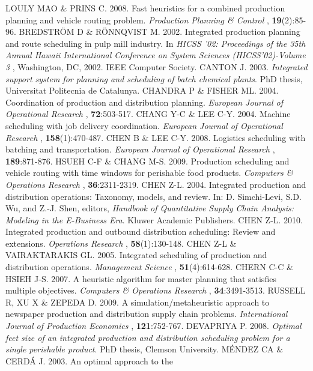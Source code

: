 \begin{biblio}[REFERENCES]
 LOULY MAO \& PRINS C. 2008. Fast heuristics for a
 combined production planning and vehicle routing problem. \textit{Production Planning
 \& Control} , \textbf{19}(2):85-96.
\tit{ }BREDSTRÖM D \& RÖNNQVIST M. 2002. Integrated production planning
 and route scheduling in pulp mill industry. In \textit{HICSS '02: Proceedings of the
 35th Annual Hawaii International Conference on System Sciences (HICSS'02)-Volume
 3} , Washington, DC, 2002. IEEE Computer Society.
\tit{ }CANTON J. 2003. \textit{Integrated support system for planning and
 scheduling of batch chemical plants}. PhD thesis, Universitat Politecnia
 de Catalunya.
\tit{ }CHANDRA P \& FISHER ML. 2004. Coordination of production and
 distribution planning. \textit{European Journal of Operational Research} ,
 \textbf{72}:503-517.
\tit{ }CHANG Y-C \& LEE C-Y. 2004. Machine scheduling with job delivery
 coordination. \textit{European Journal of Operational Research} ,
 \textbf{158}(1):470-487.
\tit{ }CHEN B \& LEE C-Y. 2008. Logistics scheduling with batching and
 transportation. \textit{European Journal of Operational Research} ,
 \textbf{189}:871-876.
 HSUEH C-F \& CHANG M-S. 2009. Production scheduling
 and vehicle routing with time windows for perishable food products. \textit{Computers
 \& Operations Research} , \textbf{36}:2311-2319.
\tit{ }CHEN Z-L. 2004. Integrated production and distribution operations:
 Taxonomy, models, and review. In: D. Simchi-Levi, S.D. Wu, and Z.-J. Shen, editors,
 \textit{Handbook of Quantitative Supply Chain Analysis: Modeling in the E-Business
 Era}. Kluwer Academic Publishers.
\tit{ }CHEN Z-L. 2010. Integrated production and outbound distribution
 scheduling: Review and extensions. \textit{Operations Research} ,
 \textbf{58}(1):130-148.
\tit{ }CHEN Z-L \& VAIRAKTARAKIS GL. 2005. Integrated scheduling of
 production and distribution operations. \textit{Management Science} ,
 \textbf{51}(4):614-628.
\tit{ }CHERN C-C \& HSIEH J-S. 2007. A heuristic algorithm for master
 planning that satisfies multiple objectives. \textit{Computers \& Operations
 Research} , \textbf{34}:3491-3513.
 RUSSELL R, XU X \& ZEPEDA D. 2009. A
 simulation/metaheuristic approach to newspaper production and distribution supply
 chain problems. \textit{International Journal of Production Economics} ,
 \textbf{121}:752-767.
\tit{ }DEVAPRIYA P. 2008. \textit{Optimal feet size of an integrated
 production and distribution scheduling problem for a single perishable
 product}. PhD thesis, Clemson University.
 MÉNDEZ CA \& CERDÁ J. 2003. An optimal approach to the

\end{biblio}
